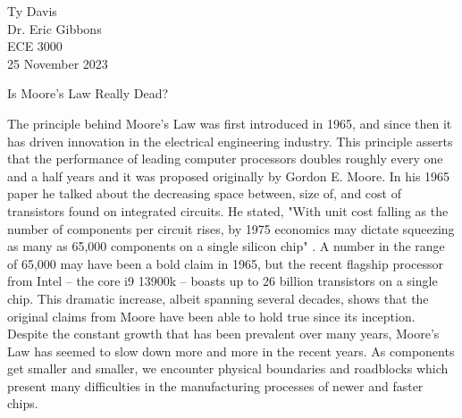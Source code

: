 \documentclass[12pt]{article}
\begin{document}
\begin{flushleft}

Ty Davis\\
Dr. Eric Gibbons\\
ECE 3000\\
25 November 2023\\


\begin{center}
Is Moore's Law Really Dead?
\end{center}



\setlength{\parindent}{0.5in}

The principle behind Moore's Law was first introduced
in 1965, and since then it has driven innovation in
the electrical engineering industry. This principle
asserts that the performance of leading computer processors
doubles roughly every one and a half years and it was
proposed originally by Gordon E. Moore. In his 1965
paper he talked about the decreasing space between,
size of, and cost of transistors found on integrated
circuits. He stated, "With unit cost falling as the
number of components per circuit rises, by 1975 economics
may dictate squeezing as many as 65,000 components
on a single silicon chip" \parencite{4785860}. A number
in the range of 65,000 may have been a bold claim in
1965, but the recent flagship processor from Intel
-- the core i9 13900k -- boasts up to 26 billion transistors
on a single chip. This dramatic increase, albeit spanning
several decades, shows that the original claims from
Moore have been able to hold true since its inception.
Despite the constant growth that has been prevalent
over many years, Moore's Law has seemed to slow down
more and more in the recent years. As components get
smaller and smaller, we encounter physical boundaries
and roadblocks which present many difficulties in
the manufacturing processes of newer and faster chips.


\end{flushleft}
\end{document}
